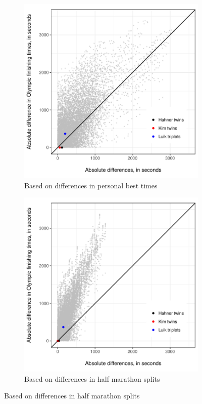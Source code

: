 \documentclass[12pt,titlepage]{article}
\begin{document}
\begin{figure}[!ht]
 \caption{Pair-wise differences in Olympic finishing times and
   differences in marathon talent}
  \label{fig:diffdiff}
 \centering
 \begin{subfigure}{.49\textwidth}
 \includegraphics[width=\textwidth, keepaspectratio]{diff_in_diff_scatter_plot.pdf}
 \caption{Based on differences in personal best times}
  \label{fig:diffdiffscatter}
 \end{subfigure}
  \begin{subfigure}{.49\textwidth}
 \includegraphics[width=\textwidth, keepaspectratio]{diff_in_diff_scatter_plot_half.pdf}
 \caption{Based on differences in half marathon splits}
  \label{fig:diffdiffscatterhalf}
 \end{subfigure}
\end{figure}
\end{document}
